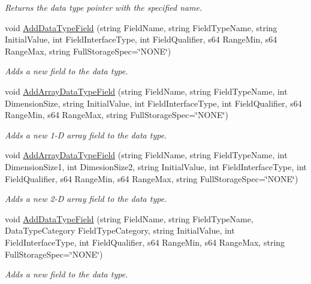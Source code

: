\begin{DoxyCompactItemize}
\begin{DoxyCompactList}\small\item\em Returns the data type pointer with the specified name. \end{DoxyCompactList}\item 
void \hyperlink{classpc__emulator_1_1PCDataType_a04cec6de95b121a699401ce41e9da928}{Add\+Data\+Type\+Field} (string Field\+Name, string Field\+Type\+Name, string Initial\+Value, int Field\+Interface\+Type, int Field\+Qualifier, s64 Range\+Min, s64 Range\+Max, string Full\+Storage\+Spec=\char`\"{}N\+O\+NE\char`\"{})
\begin{DoxyCompactList}\small\item\em Adds a new field to the data type. \end{DoxyCompactList}\item 
void \hyperlink{classpc__emulator_1_1PCDataType_a8daa2490552cf2ce05927b9e8f5a2d4a}{Add\+Array\+Data\+Type\+Field} (string Field\+Name, string Field\+Type\+Name, int Dimension\+Size, string Initial\+Value, int Field\+Interface\+Type, int Field\+Qualifier, s64 Range\+Min, s64 Range\+Max, string Full\+Storage\+Spec=\char`\"{}N\+O\+NE\char`\"{})
\begin{DoxyCompactList}\small\item\em Adds a new 1-\/D array field to the data type. \end{DoxyCompactList}\item 
void \hyperlink{classpc__emulator_1_1PCDataType_a2afd3209eb469e8a276248d876894a8f}{Add\+Array\+Data\+Type\+Field} (string Field\+Name, string Field\+Type\+Name, int Dimension\+Size1, int Dimesion\+Size2, string Initial\+Value, int Field\+Interface\+Type, int Field\+Qualifier, s64 Range\+Min, s64 Range\+Max, string Full\+Storage\+Spec=\char`\"{}N\+O\+NE\char`\"{})
\begin{DoxyCompactList}\small\item\em Adds a new 2-\/D array field to the data type. \end{DoxyCompactList}\item 
void \hyperlink{classpc__emulator_1_1PCDataType_a3f9ae599f54c53a1cc0bec374e4ae813}{Add\+Data\+Type\+Field} (string Field\+Name, string Field\+Type\+Name, Data\+Type\+Category Field\+Type\+Category, string Initial\+Value, int Field\+Interface\+Type, int Field\+Qualifier, s64 Range\+Min, s64 Range\+Max, string Full\+Storage\+Spec=\char`\"{}N\+O\+NE\char`\"{})
\begin{DoxyCompactList}\small\item\em Adds a new field to the data type. \end{DoxyCompactList}\item 

\end{DoxyCompactItemize}
